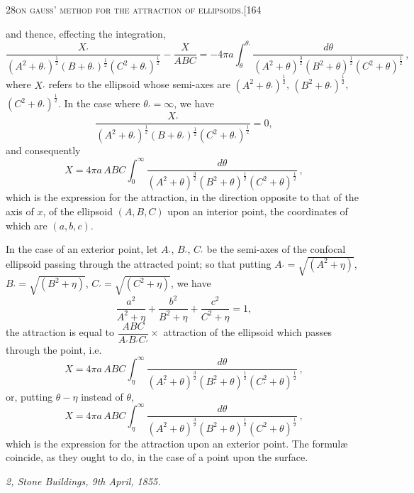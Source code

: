 \documentclass[11pt]{article}
\begin{document}
\newpage

\begin{center}
\small\textsc{28}\hfill\textsc{on gauss' method for the attraction of ellipsoids.}\hfill[164
\end{center}

\medskip

\noindent and thence, effecting the integration,
\[
\frac{X_{\prime}}{(A^{2} + \theta_{\prime})^{\frac{1}{2}}(B + \theta_{\prime})^{\frac{1}{2}}(C^{2} + \theta_{\prime})^{\frac{1}{2}}} - \frac{X}{ABC} = -4\pi a \int_{\theta}^{\theta_{\prime}}\frac{d\theta}{(A^{2} + \theta)^{\frac{3}{2}}(B^{2} + \theta)^{\frac{1}{2}}(C^{2} + \theta)^{\frac{1}{2}}}\,,
\]
where $X_{\prime}$ refers to the ellipsoid whose semi-axes are $(A^{2} + \theta_{\prime})^{\frac{1}{2}}$, $(B^{2} + \theta_{\prime})^{\frac{1}{2}}$, $(C^{2} + \theta_{\prime})^{\frac{1}{2}}$.
In the case where $\theta_{\prime} = \infty$, we have
\[
\frac{X_{\prime}}{(A^{2} + \theta_{\prime})^{\frac{1}{2}}(B + \theta_{\prime})^{\frac{1}{2}}(C^{2} + \theta_{\prime})^{\frac{1}{2}}} = 0,
\]
and consequently
\[
X = 4\pi a\,ABC \int_{0}^{\infty}\frac{d\theta}{(A^{2} + \theta)^{\frac{3}{2}}(B^{2} + \theta)^{\frac{1}{2}}(C^{2} + \theta)^{\frac{1}{2}}}\,,
\]
which is the expression for the attraction, in the direction opposite to that of the axis
of $x$, of the ellipsoid $(A, B, C)$ upon an interior point, the coordinates of which are
$(a, b, c)$.

In the case of an exterior point, let $A_{\prime}$, $B_{\prime}$, $C_{\prime}$ be the semi-axes of the confocal
ellipsoid passing through the attracted point; so that putting $A_{\prime} = \sqrt{(A^{2} + \eta)}$, $B_{\prime} = \sqrt{(B^{2} + \eta)}$,
$C_{\prime} = \sqrt{(C^{2} + \eta)}$, we have
\[
\frac{a^{2}}{A^{2} + \eta} + \frac{b^{2}}{B^{2} + \eta} + \frac{c^{2}}{C^{2} + \eta} = 1,
\]
the attraction is equal to $\dfrac{ABC}{A_{\prime}B_{\prime}C_{\prime}} \times$ attraction of the ellipsoid which passes through the
point, i.e.
\[
X = 4\pi a\,ABC \int_{\eta}^{\infty}\frac{d\theta}{(A_{\prime}^{2} + \theta)^{\frac{3}{2}}(B_{\prime}^{2} + \theta)^{\frac{1}{2}}(C_{\prime}^{2} + \theta)^{\frac{1}{2}}}\,,
\]
or, putting $\theta - \eta$ instead of $\theta$,
\[
X = 4\pi a\,ABC \int_{\eta}^{\infty}\frac{d\theta}{(A^{2} + \theta)^{\frac{3}{2}}(B^{2} + \theta)^{\frac{1}{2}}(C^{2} + \theta)^{\frac{1}{2}}}\,,
\]
which is the expression for the attraction upon an exterior point. The formul\ae{} coincide,
as they ought to do, in the case of a point upon the surface.

\bigskip

\noindent\textit{2, Stone Buildings, 9th April, 1855.}
\end{document}
